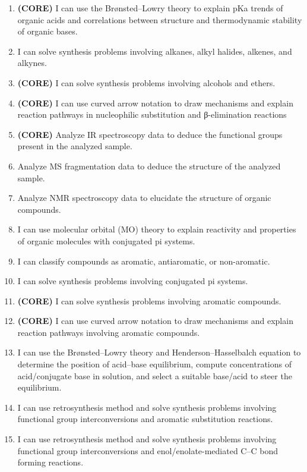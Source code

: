 \begin{enumerate}
\def\labelenumi{\arabic{enumi}.}
\tightlist
\item
  \textbf{(CORE)} I can use the Brønsted--Lowry theory to explain pKa
  trends of organic acids and correlations between structure and
  thermodynamic stability of organic bases.
\item
  I can solve synthesis problems involving alkanes, alkyl halides,
  alkenes, and alkynes.
\item
  \textbf{(CORE)} I can solve synthesis problems involving alcohols and
  ethers.
\item
  \textbf{(CORE)} I can use curved arrow notation to draw mechanisms and
  explain reaction pathways in nucleophilic substitution and
  β-elimination reactions
\item
  \textbf{(CORE)} Analyze IR spectroscopy data to deduce the functional
  groups present in the analyzed sample.
\item
  Analyze MS fragmentation data to deduce the structure of the analyzed
  sample.
\item
  Analyze NMR spectroscopy data to elucidate the structure of organic
  compounds.
\item
  I can use molecular orbital (MO) theory to explain reactivity and
  properties of organic molecules with conjugated pi systems.
\item
  I can classify compounds as aromatic, antiaromatic, or non-aromatic.
\item
  I can solve synthesis problems involving conjugated pi systems.
\item
  \textbf{(CORE)} I can solve synthesis problems involving aromatic
  compounds.
\item
  \textbf{(CORE)} I can use curved arrow notation to draw mechanisms and
  explain reaction pathways involving aromatic compounds.
\item
  I can use the Brønsted--Lowry theory and Henderson--Hasselbalch
  equation to determine the position of acid--base equilibrium, compute
  concentrations of acid/conjugate base in solution, and select a
  suitable base/acid to steer the equilibrium.
\item
  I can use retrosynthesis method and solve synthesis problems involving
  functional group interconversions and aromatic substitution reactions.
\item
  I can use retrosynthesis method and solve synthesis problems involving
  functional group interconversions and enol/enolate-mediated C--C bond
  forming reactions.
\end{enumerate}
